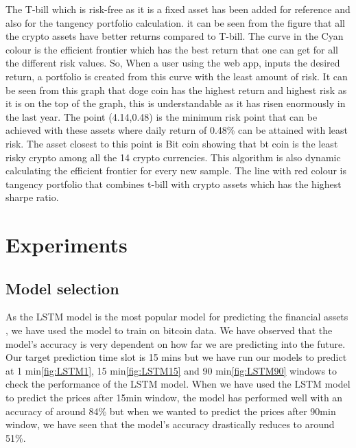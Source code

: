 \documentclass[final]{cvpr}
\begin{document}
The T-bill which is risk-free as it is a fixed asset has been added for reference and also for the tangency portfolio calculation. it can be seen from the figure that all the crypto assets have better returns compared to T-bill. The curve in the Cyan colour is the efficient frontier which has the best return that one can get for all the different risk values. So, When a user using the web app, inputs the desired return, a portfolio is created from this curve with the least amount of risk. It can be seen from this graph that doge coin has the highest return and highest risk as it is on the top of the graph, this is understandable as it has risen enormously in the last year. The point (4.14,0.48) is the minimum risk point that can be achieved with these assets where daily return of 0.48\% can be attained with least risk. The asset closest to this point is Bit coin showing that bt coin is the least risky crypto among all the 14 crypto currencies. This algorithm is also dynamic calculating the efficient frontier for every new sample. The line with red colour is tangency portfolio that combines t-bill with crypto assets which has the highest sharpe ratio.
\section{Experiments}
\subsection{Model selection}
As the LSTM model is the most popular model for predicting the financial assets \cite{Deep}, we have used the model to train on bitcoin data. We have observed that the model's accuracy is very dependent on how far we are predicting into the future. Our target prediction time slot is 15 mins but we have run our models to predict at 1 min\ref{fig:LSTM1}, 15 min\ref{fig:LSTM15} and 90 min\ref{fig:LSTM90} windows to check the performance of the LSTM model. When we have used the LSTM model to predict the prices after 15min window, the model has performed well with an accuracy of around 84\% but when we wanted to predict the prices after 90min window, we have seen that the model's accuracy drastically reduces to around 51\%.
\end{document}
